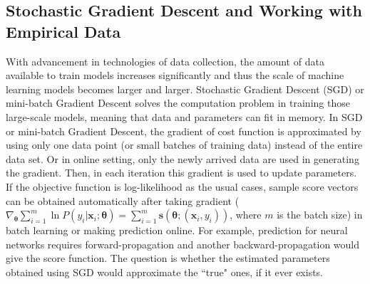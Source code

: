 \documentclass[twoside,11pt]{article}
\begin{document}
\subsection{Stochastic Gradient Descent and Working with Empirical Data}
\label{ss:sgd_score}
With advancement in technologies of data collection, the amount of data available to train models increases significantly and thus the scale of machine learning models becomes larger and larger. Stochastic Gradient Descent (SGD) or mini-batch Gradient Descent solves the computation problem in training those large-scale models, meaning that data and parameters can fit in memory. In SGD or mini-batch Gradient Descent, the gradient of cost function is approximated by using only one data point (or small batches of training data) instead of the entire data set. Or in online setting, only the newly arrived data are used in generating the gradient. Then, in each iteration this gradient is used to update parameters. If the objective function is log-likelihood as the usual cases, sample score vectors can be obtained automatically after taking gradient ($\nabla _{\bm { \theta}} \sum _{i=1} ^{m} \ln P(y_i|\bm {x}_i;\bm{\theta}) = \sum _{i=1} ^{m} \bm{s}(\bm { \theta};(\bm {x}_i, y_i))$, where $m$ is the batch size) in batch learning or making prediction online. For example, prediction for neural networks requires forward-propagation and another backward-propagation would give the score function. The question is whether the estimated parameters obtained using SGD would approximate the ``true" ones, if it ever exists.
\end{document}
